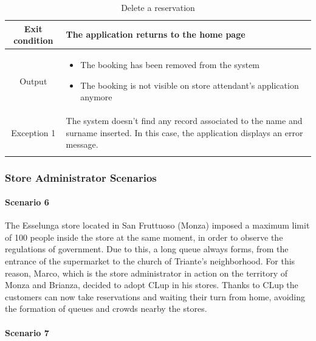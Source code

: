 \documentclass[table, 12pt]{article}
\begin{document}
\begin{longtable}{|c| p{10cm}|}
    \hline
    Exit condition   & The application returns to the home page                                                                                                 \\ \hline
    Output           & \begin{itemize}
        \item The booking has been removed from the system
        \item The booking is not visible on store attendant's application anymore
    \end{itemize}
    \\
    \hline
    \hline
    Exception 1      & The system doesn't find any record associated to the name and surname inserted. In this case, the application displays an error message. \\
    \hline
    \caption{Delete a reservation}                                                                                                                              \\
\end{longtable}



\subsubsection{Store Administrator Scenarios}
\paragraph{Scenario 6}

The Esselunga store located in San Fruttuoso (Monza) imposed a maximum limit of 100 people inside the store at the same moment, in order to observe the regulations of government. Due to this, a long queue always forms, from the entrance of the supermarket to the church of Triante's neighborhood. For this reason, Marco, which is the store administrator in action on the territory of Monza and Brianza, decided to adopt CLup in his stores.
Thanks to CLup the customers can now take reservations and waiting their turn from home, avoiding the formation of queues and crowds nearby the stores.\\




\paragraph{Scenario 7}
\end{document}
